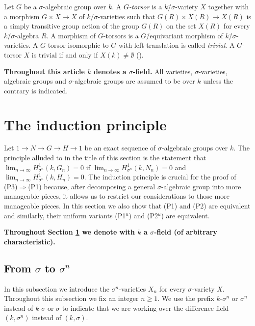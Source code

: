 \documentclass[oneside,reqno]{amsart}
\theoremstyle{definition}
\newcommand{\s}{\sigma}
\newcommand{\ks}{$k$\=/$\s$}
\newcommand{\po}{{\rm{(P1$^u$)}}}
\newcommand{\pw}{{\rm{(P2$^u$)}}}
\newcommand{\poweak}{{\rm{(P1)}}}
\newcommand{\ptweak}{{\rm{(P3)}}}
\newcommand{\pwweak}{{\rm{(P2)}}}
\begin{document}
Let $G$ be a $\s$-algebraic group over $k$. A \emph{$G$-torsor} is a \ks-variety $X$ together with a morphism $G\times X\to X$ of \ks-varieties such that $G(R)\times X(R)\to X(R)$ is a simply transitive group action of the group $G(R)$ on the set $X(R)$ for every \ks-algebra $R$. A morphism of $G$-torsors is a $G$\=/equivariant morphism of \ks-varieties. A $G$-torsor isomorphic to $G$ with left-translation is called \emph{trivial}. A $G$-torsor $X$ is trivial if and only if $X(k)\neq\emptyset$ (\cite[Remark 1.3]{BachmayrWibmer:TorsorsForDifferenceAlgebraicGroups}).   

\medskip  

{\bf Throughout this article $k$ denotes a $\s$-field.} All varieties, $\s$-varieties, algebraic groups and $\s$-algebraic groups are assumed to be over $k$ unless the contrary is indicated.
 

\section{The induction principle} \label{section: The induction principle}

Let $1\to N\to G\to H\to 1$ be an exact sequence of $\s$-algebraic groups over $k$. The principle alluded to in the title of this section is the statement that  $\lim_{n\to\infty}H^1_{\s^n}(k,G_n)=0$ if $\lim_{n\to\infty}H^1_{\s^n}(k,N_n)=0$ and  $\lim_{n\to\infty}H^1_{\s^n}(k,H_n)=0$. The induction principle is crucial for the proof of \ptweak{}$\Rightarrow$\poweak{} because, after decomposing a general $\s$-algebraic group into more manageable pieces, it allows us to restrict our considerations to those more manageable pieces. In this section we also show that \poweak{} and \pwweak{} are equivalent and similarly, their uniform variants \po{} and \pw{} are equivalent. 

\medskip

{\bf Throughout Section \ref{section: The induction principle} we denote with $k$ a $\s$-field (of arbitrary characteristic).}



 \subsection{From $\s$ to $\s^n$} \label{subsection: From s to sn}
In this subsection we introduce the $\s^n$-varieties $X_n$ for every $\s$-variety $X$. Throughout this subsection we fix an integer $n\geq 1$.
We use the prefix $k$-$\s^n$ or $\s^n$ instead of $k$-$\s$ or $\s$ to indicate that we are working over the difference field $(k, \s^n)$ instead of $(k,\s)$. 
 
\end{document}
